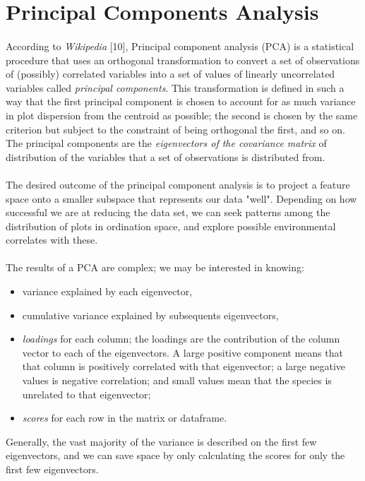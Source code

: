 \documentclass[10pt]{article}\usepackage[]{graphicx}\usepackage[]{color}
\begin{document}
\clearpage
\section{Principal Components Analysis}
\paragraph{}
According to \textit{Wikipedia} [10],
Principal component analysis (PCA) is a statistical procedure that uses an 
orthogonal transformation to convert a set of observations of (possibly) 
correlated variables into a set of values of linearly uncorrelated variables 
called \textit{principal components}. This transformation is defined in such 
a way that the first principal component is chosen to account for as much 
variance in plot dispersion from the centroid as possible; the second is chosen 
by the same criterion but subject to the constraint of being orthogonal the first, 
and so on. The principal components are the \textit{eigenvectors of the covariance 
matrix} of distribution of the variables that a set of observations is 
distributed from. 
\paragraph{}
The desired outcome of the principal component analysis is to project a feature 
space onto a smaller subspace that represents our data "well". Depending on how 
successful we are at reducing the data set, we can seek patterns among the 
distribution of plots in ordination space, and explore possible environmental 
correlates with these. 
\paragraph{}
The results of a PCA are complex; we may be interested in knowing: 
\begin{itemize}
\item variance explained by each eigenvector,
\item cumulative variance explained by subsequents eigenvectors,
\item \textit{loadings} for each column; the loadings are the contribution of 
the column vector to each of the eigenvectors. A large positive component means 
that that column is positively correlated with that eigenvector; 
a large negative values is negative correlation; 
and small values mean that the species is unrelated to that eigenvector; 
\item \textit{scores} for each row in the matrix or dataframe. 
\end{itemize}
Generally, the vast majority of the variance is described on the first 
few eigenvectors, 
and we can save space by only calculating the scores for only the first 
few eigenvectors. 
\end{document}
